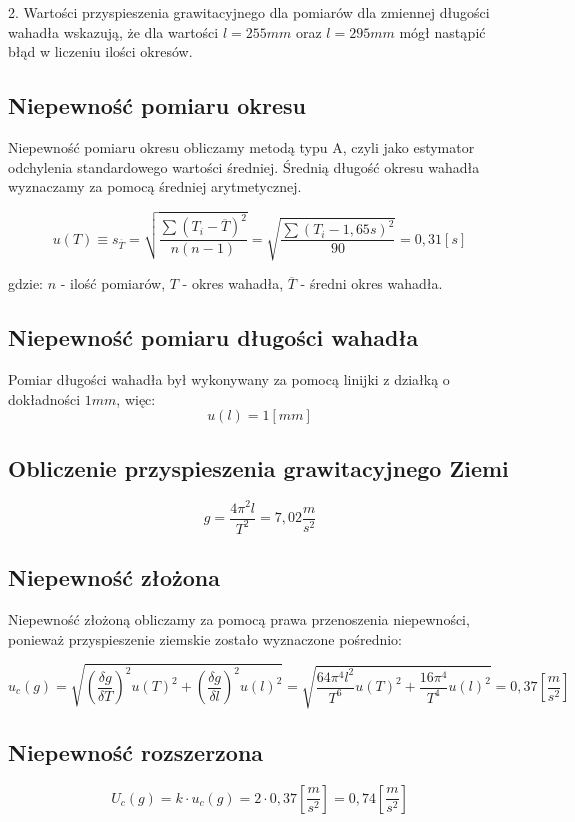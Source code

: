 \documentclass[a4paper,10pt,twoside]{article}
\begin{document}
2. Wartości przyspieszenia grawitacyjnego dla pomiarów dla zmiennej długości wahadła wskazują, że dla wartości $l=255 \unit{mm}$ oraz $l=295 \unit{mm}$ mógł nastąpić błąd w liczeniu ilości okresów.

\subsection{Niepewność pomiaru okresu}

Niepewność pomiaru okresu obliczamy metodą typu A, czyli jako estymator odchylenia standardowego wartości średniej. Średnią długość okresu wahadła wyznaczamy za pomocą średniej arytmetycznej.


$$u(T)\equiv s_{\overline{T}} = \sqrt{\frac{\sum{(T_i-\overline{T})^2}}{n(n-1)}} = \sqrt{\frac{\sum{(T_i-1,65 \unit{s})^2}}{90}} = 0,31 \unit{[s]} $$

gdzie: $n$ - ilość pomiarów, $T$ - okres wahadła, $\overline{T}$ - średni okres wahadła.

\subsection{Niepewność pomiaru długości wahadła}
Pomiar długości wahadła był wykonywany za pomocą linijki z działką o dokładności $1 \unit{mm}$, więc:
$$u(l)=1 \unit{[mm]}$$

\subsection{Obliczenie przyspieszenia grawitacyjnego Ziemi}

$$g = \frac{4\pi^2l}{T^2} = 7,02 \unit{\frac{m}{s^2}}$$

\subsection{Niepewność złożona}
Niepewność złożoną obliczamy za pomocą prawa przenoszenia niepewności, ponieważ przyspieszenie ziemskie zostało wyznaczone pośrednio:

$$u_c(g)=\sqrt{(\frac{\delta g}{\delta T})^2 u(T)^2+(\frac{\delta g}{\delta l})^2 u(l)^2}=\sqrt{\frac{64\pi^4 l^2}{T^6}u(T)^2+\frac{16\pi^4}{T^4}u(l)^2} =  0,37 \unit{[\frac{m}{s^2}]}$$

\subsection{Niepewność rozszerzona}

$$U_c(g) = k \cdot u_c(g) = 2 \cdot 0,37 [\frac{m}{s^2}] = 0,74 \unit{[\frac{m}{s^2}]}$$
\end{document}
